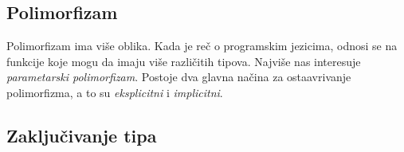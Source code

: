 \fi 


\subsection{Polimorfizam}

Polimorfizam ima više oblika. Kada je reč o programskim jezicima, odnosi se na funkcije koje mogu da imaju više različitih tipova. Najviše nas interesuje \textit{parametarski polimorfizam}. Postoje dva glavna načina za ostaavrivanje polimorfizma, a to su \textit{eksplicitni} i \textit{implicitni}. 


\subsection{Zaključivanje tipa}

\iffalse 
The basic algorithm can be described as follows.
Case 1. When a new variable x is introduced by a fun binder, it is assigned a new type variable
a meaning that its type must be further determined by the context of its occurrences. The pair
<x,a> is stored in an environment which is searched every time an occurrence of x, is found,
yielding a (or any intervening instantiation of it) as the type of that occurrence.
Case 2. In a conditional, the if component is matched to bool, and the then and else branches
are unified in order to determine a unique type for the whole expression.
Case 3. In an abstraction fun(x) e the type of e is inferred in a context where x is associated to
a new type variable.
Case 4. In an application f(a), the type of f is unified against a type A -> b, where A is the type
of a and b is a new type variable. This implies that the type of f must be a function type

whose domain is unifiable to A; b (or any instantiation of it) is returned as the type of the
whole application.


\fi 